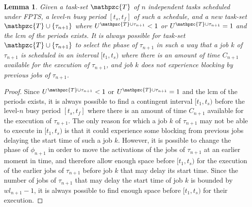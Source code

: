 \documentclass[fleqn]{article}
\newtheorem{lemma}{Lemma}
\begin{document}

\begin{lemma}
	Given a task-set $\mathpzc{T}$ of $n$ independent tasks scheduled under FPTS, a level-$n$ busy period $[t_s,t_f]$ of such a schedule, and a new task-set $\mathpzc{T} \cup \{\tau_{n+1}\}$ where $U^{\mathpzc{T} \cup \tau_{n+1}}<1$ or $U^{\mathpzc{T} \cup \tau_{n+1}} = 1$ and the lcm of the periods exists. It is always possible for task-set $\mathpzc{T} \cup \{\tau_{n+1}\}$ to select the phase of $\tau_{n+1}$ in such a way that a job $k$ of $\tau_{n+1}$ is scheduled in an interval $[t_1,t_s)$ where there is an amount of time $C_{n+1}$ available for the execution of $\tau_{n+1}$, and job $k$ does not experience blocking by previous jobs of $\tau_{n+1}$.
\end{lemma}

\begin{proof}
	Since $U^{\mathpzc{T} \cup \tau_{n+1}}<1$ or $U^{\mathpzc{T} \cup \tau_{n+1}} = 1$ and the lcm of the periods exists, it is always possible to find a contingent interval $[t_1,t_s)$ before the level-$n$ busy period $[t_s,t_f]$ where there is an amount of time $C_{n+1}$ available for the execution of $\tau_{n+1}$. The only reason for which a job $k$ of $\tau_{n+1}$ may not be able to execute in $[t_1,t_s)$ is that it could experience some blocking from previous jobs delaying the start time of such a job $k$. However, it is possible to change the phase of $\phi_{n+1}$ in order to move the activations of the jobs of $\tau_{n+1}$ at an earlier moment in time, and therefore allow enough space before $[t_1,t_s)$ for the execution of the earlier jobs of $\tau_{n+1}$ before job $k$ that may delay its start time. Since the number of jobs of $\tau_{n+1}$ that may delay the start time of job $k$ is bounded by $wl_{n+1}-1$, it is always possible to find enough space before $[t_1,t_s)$ for their execution.
\end{proof}
\end{document}
